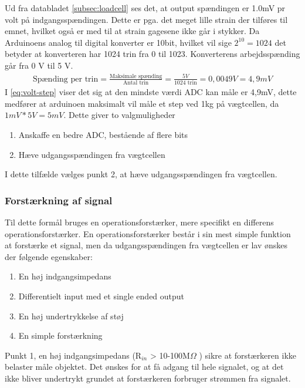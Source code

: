 Ud fra databladet \ref{subsec:loadcell} ses det, at output spændingen er 1.0mV pr volt på indgangsspændingen. Dette er pga. det meget lille strain der tilføres til emnet, hvilket også er med til at strain gagesene ikke går i stykker. Da Arduinoens analog til digital konverter er 10bit, hvilket vil sige $2^{10}=1024$ det betyder at konverteren har 1024 trin fra 0 til 1023. Konverterens arbejdsspænding går fra 0 V til 5 V. 
\begin{align}
 \text{Spænding per trin}=\frac{\text{Maksimale spænding}}{\text{Antal trin}}=\frac{5 V}{1024\text{ trin}}=0,0049V=4,9mV
 \label{eq:volt-step}
 \end{align}
I \ref{eq:volt-step} viser det sig at den mindste værdi ADC kan måle er 4,9mV, dette medfører at arduinoen maksimalt vil måle et step ved 1kg på vægtcellen, da $1mV*5V=5mV$. Dette giver to valgmuligheder
\begin{enumerate}
\item Anskaffe en bedre ADC, bestående af flere bits
\item Hæve udgangsspændingen fra vægtcellen 
\end{enumerate}
I dette tilfælde vælges punkt 2, at hæve udgangsspændingen fra vægtcellen. 
\subsubsection*{Forstærkning af signal}
Til dette formål bruges en operationsforstærker, mere specifikt en differens operationsforstærker. En operationsforstærker består i sin mest simple funktion at forstærke et signal, men da udgangsspændingen fra vægtcellen er lav ønskes der følgende egenskaber:
\begin{enumerate}
\item En høj indgangsimpedans 
\item Differentielt input med et single ended output
\item En høj undertrykkelse af støj
\item En simple forstærkning
\end{enumerate}
Punkt 1, en høj indgangsimpedans (R$_{in}$ > 10-100M$\Omega$ ) sikre at forstærkeren ikke belaster måle objektet. Det ønskes for at få adgang til hele signalet, og at det ikke bliver undertrykt grundet at forstærkeren forbruger strømmen fra signalet.

